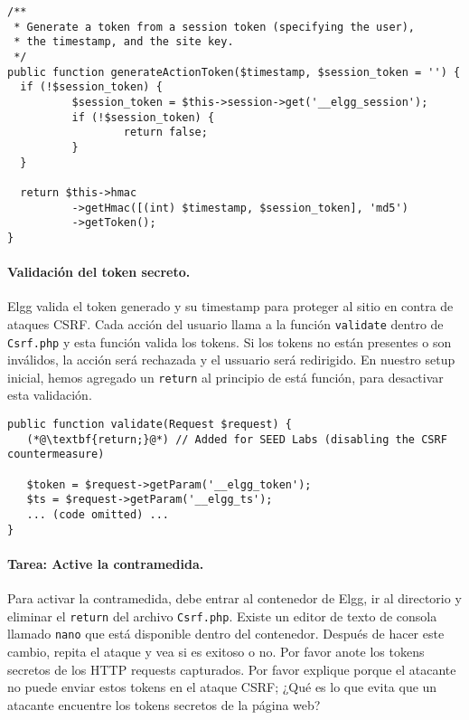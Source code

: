 \begin{lstlisting}
/**
 * Generate a token from a session token (specifying the user), 
 * the timestamp, and the site key.
 */
public function generateActionToken($timestamp, $session_token = '') {
  if (!$session_token) {
          $session_token = $this->session->get('__elgg_session');
          if (!$session_token) {
                  return false;
          }
  }

  return $this->hmac
          ->getHmac([(int) $timestamp, $session_token], 'md5')
          ->getToken();
}
\end{lstlisting}


\paragraph{Validación del token secreto.}
Elgg valida el token generado y su timestamp para proteger al sitio en contra de ataques CSRF. Cada acción del usuario llama a la función \texttt{validate} dentro de \texttt{Csrf.php} y esta función valida los tokens.
Si los tokens no están presentes o son inválidos, la acción será rechazada y el ussuario será redirigido. En nuestro setup inicial, hemos agregado un \texttt{return} al principio de está función, para desactivar esta validación.

\begin{lstlisting}
public function validate(Request $request) {
   (*@\textbf{return;}@*) // Added for SEED Labs (disabling the CSRF countermeasure)

   $token = $request->getParam('__elgg_token');
   $ts = $request->getParam('__elgg_ts');
   ... (code omitted) ...
}
\end{lstlisting}



\paragraph{Tarea: Active la contramedida.}
Para activar la contramedida, debe entrar al contenedor de Elgg, ir al directorio 
 y eliminar el  \texttt{return} del archivo  \texttt{Csrf.php}.
Existe un editor de texto de consola llamado \texttt{nano} que está disponible dentro del contenedor. Después de hacer este cambio, repita el ataque y vea si es exitoso o no.
Por favor anote los tokens secretos de los HTTP requests capturados.
Por favor explique porque el atacante no puede enviar estos tokens en el ataque CSRF; ¿Qué es lo que evita que un atacante encuentre los tokens secretos de la página web?

